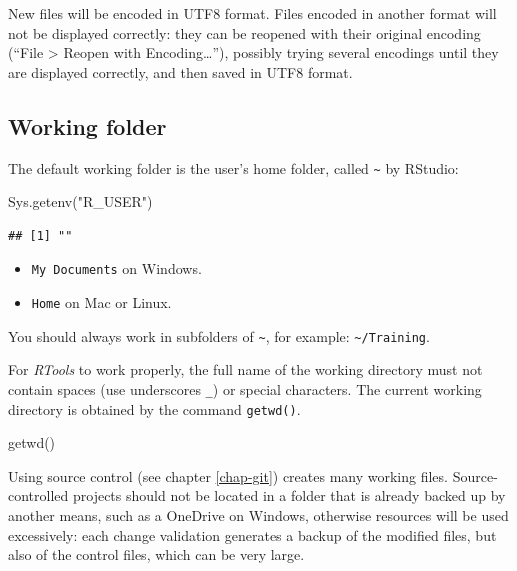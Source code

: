 \documentclass[
  12pt,
  american,
  a4paper,
  extrafontsizes,onecolumn,openright
  ]{memoir}
\newenvironment{Shaded}{\begin{snugshade}}{\end{snugshade}}
\newcommand{\FunctionTok}[1]{\textcolor[rgb]{0.00,0.00,0.00}{#1}}
\newcommand{\NormalTok}[1]{#1}
\newcommand{\StringTok}[1]{\textcolor[rgb]{0.31,0.60,0.02}{#1}}
\providecommand{\tightlist}{%
  \setlength{\itemsep}{0pt}\setlength{\parskip}{0pt}}
\begin{document}
New files will be encoded in UTF8 format.
Files encoded in another format will not be displayed correctly: they can be reopened with their original encoding (\enquote{File \textgreater{} Reopen with Encoding\ldots{}}), possibly trying several encodings until they are displayed correctly, and then saved in UTF8 format.

\hypertarget{working-folder}{%
\subsection{Working folder}\label{working-folder}}

The default working folder is the user's home folder, called \texttt{\textasciitilde{}} by RStudio:

\scriptsize

\begin{Shaded}
\begin{Highlighting}[]
\FunctionTok{Sys.getenv}\NormalTok{(}\StringTok{"R\_USER"}\NormalTok{)}
\end{Highlighting}
\end{Shaded}

\begin{verbatim}
## [1] ""
\end{verbatim}

\normalsize

\begin{itemize}
\tightlist
\item
  \texttt{My\ Documents} on Windows.
\item
  \texttt{Home} on Mac or Linux.
\end{itemize}

You should always work in subfolders of \texttt{\textasciitilde{}}, for example: \texttt{\textasciitilde{}/Training}.

For \emph{RTools} to work properly, the full name of the working directory must not contain spaces (use underscores \texttt{\_}) or special characters.
The current working directory is obtained by the command \texttt{getwd()}.

\scriptsize

\begin{Shaded}
\begin{Highlighting}[]
\FunctionTok{getwd}\NormalTok{()}
\end{Highlighting}
\end{Shaded}

\normalsize

Using source control (see chapter \ref{chap-git}) creates many working files.
Source-controlled projects should not be located in a folder that is already backed up by another means, such as a OneDrive on Windows, otherwise resources will be used excessively: each change validation generates a backup of the modified files, but also of the control files, which can be very large.
\end{document}

